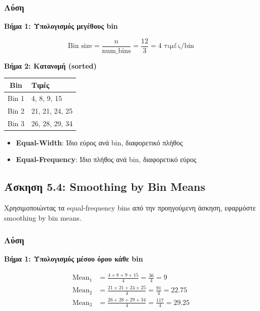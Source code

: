 \subsubsection*{Λύση}

\textbf{Βήμα 1: Υπολογισμός μεγέθους bin}

$$\text{Bin size} = \frac{n}{\text{num\_bins}} = \frac{12}{3} = 4 \text{ τιμές/bin}$$

\textbf{Βήμα 2: Κατανομή (sorted)}

\begin{center}
\begin{tabular}{cl}
\toprule
\textbf{Bin} & \textbf{Τιμές} \\
\midrule
Bin 1 & 4, 8, 9, 15 \\
Bin 2 & 21, 21, 24, 25 \\
Bin 3 & 26, 28, 29, 34 \\
\bottomrule
\end{tabular}
\end{center}

\begin{infobox}
\begin{itemize}
    \item \textbf{Equal-Width}: Ίδιο εύρος ανά bin, διαφορετικό πλήθος
    \item \textbf{Equal-Frequency}: Ίδιο πλήθος ανά bin, διαφορετικό εύρος
\end{itemize}
\end{infobox}

\subsection{Άσκηση 5.4: Smoothing by Bin Means}

\begin{formulabox}[Εκφώνηση]
Χρησιμοποιώντας τα equal-frequency bins από την προηγούμενη άσκηση, εφαρμόστε
smoothing by bin means.
\end{formulabox}

\subsubsection*{Λύση}

\textbf{Βήμα 1: Υπολογισμός μέσου όρου κάθε bin}

\begin{align*}
\text{Mean}_1 &= \frac{4 + 8 + 9 + 15}{4} = \frac{36}{4} = 9 \\
\text{Mean}_2 &= \frac{21 + 21 + 24 + 25}{4} = \frac{91}{4} = 22.75 \\
\text{Mean}_3 &= \frac{26 + 28 + 29 + 34}{4} = \frac{117}{4} = 29.25
\end{align*}

